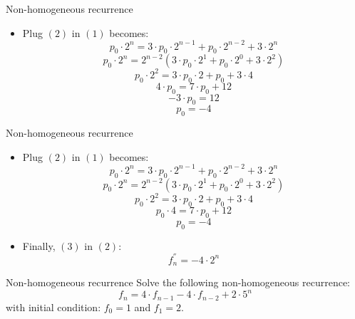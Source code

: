 \documentclass{beamer}
\begin{document}
\begin{frame}{Non-homogeneous recurrence}
   \begin{itemize}
        \item Plug $(2)$ in $(1)$ becomes:
            $$ p_0 \cdot 2^n = 3 \cdot p_0 \cdot 2^{n-1} + p_0 \cdot 2^{n-2} + 3 \cdot 2^n $$
            $$ p_0 \cdot 2^n = 2^{n-2}( 3 \cdot p_0 \cdot 2^{1} + p_0 \cdot 2^{0} + 3 \cdot 2^2) $$
            $$ p_0 \cdot 2^2 = 3 \cdot p_0 \cdot 2 + p_0 + 3 \cdot 4 $$
            $$ 4 \cdot p_0  = 7 \cdot p_0 + 12 $$
            $$ -3\cdot p_0  = 12 $$
            \begin{equation}\tag{3}
                p_0 = -4
            \end{equation}
      \end{itemize}
\end{frame}

\begin{frame}{Non-homogeneous recurrence}
   \begin{itemize}
        \item Plug $(2)$ in $(1)$ becomes:
            $$ p_0 \cdot 2^n = 3 \cdot p_0 \cdot 2^{n-1} + p_0 \cdot 2^{n-2} + 3 \cdot 2^n $$
            $$ p_0 \cdot 2^n = 2^{n-2}( 3 \cdot p_0 \cdot 2^{1} + p_0 \cdot 2^{0} + 3 \cdot 2^2) $$
            $$ p_0 \cdot 2^2 = 3 \cdot p_0 \cdot 2 + p_0 + 3 \cdot 4 $$
            $$ p_0 \cdot 4 = 7 \cdot p_0 + 12 $$
            \begin{equation}\tag{3}
                p_0 = -4
            \end{equation}
        \item Finally, $(3)$ in $(2)$:
            $$ f_n^{''} = -4 \cdot 2^n $$
      \end{itemize}
\end{frame}

\begin{frame}{Non-homogeneous recurrence}
    Solve the following non-homogeneous recurrence:
    \begin{equation}\tag{1}
        f_n = 4 \cdot f_{n-1} - 4 \cdot f_{n-2} + 2 \cdot 5^n
    \end{equation}
    with initial condition: $f_0 = 1$ and $f_1 = 2$.
\end{frame}
\end{document}
